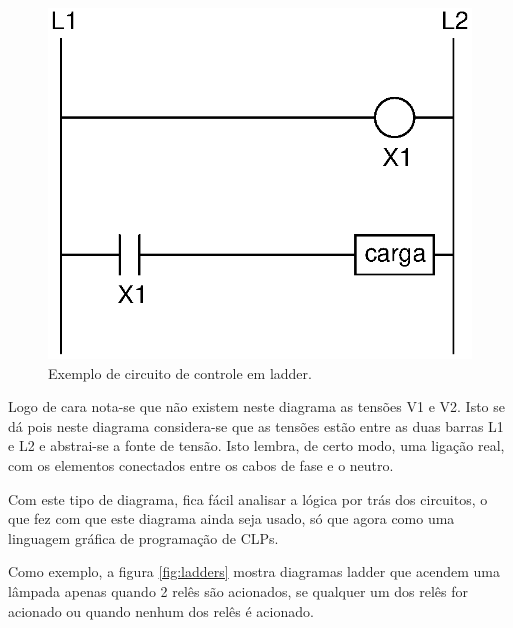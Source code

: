 \begin{figure}[!h]
  \centering
  \includegraphics[scale=0.6]{figuras/ladder1} %
  \caption{Exemplo de circuito de controle em ladder.}
  \label{fig:ladder1}
\end{figure}

Logo de cara nota-se que não existem neste diagrama as tensões V1 e V2. Isto se dá pois neste diagrama considera-se que as tensões estão entre as duas barras L1 e L2 e abstrai-se a fonte de tensão. Isto lembra, de certo modo, uma ligação real, com os elementos conectados entre os cabos de fase e o neutro.

Com este tipo de diagrama, fica fácil analisar a lógica por trás dos circuitos, o que fez com que este diagrama ainda seja usado, só que agora como uma linguagem gráfica de programação de CLPs.

Como exemplo, a figura \ref{fig:ladders} mostra diagramas ladder que acendem uma lâmpada apenas quando 2 relês são acionados, se qualquer um dos relês for acionado ou quando nenhum dos relês é acionado.

